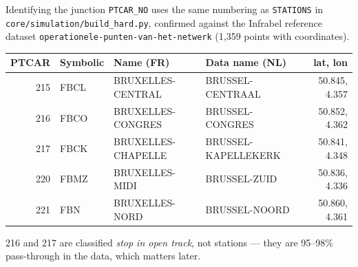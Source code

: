 \documentclass[aspectratio=169,10pt]{beamer}
\newcommand{\srcnote}[1]{{\scriptsize\color{ink3}#1}}
\begin{document}
\begin{frame}{Identifying the junction}
  \texttt{PTCAR\_NO} uses the same numbering as \texttt{STATIONS} in
  \texttt{core/simulation/build\_hard.py}, confirmed against the Infrabel reference
  dataset \texttt{operationele-punten-van-het-netwerk} (1{,}359 points with coordinates).

  \vspace{0.8em}
  \centering
  \begin{tabular}{@{}rlllr@{}}
    \toprule
    PTCAR & Symbolic & Name (FR) & Data name (NL) & lat, lon \\
    \midrule
    215 & FBCL & BRUXELLES-CENTRAL & BRUSSEL-CENTRAAL & 50.845, 4.357 \\
    216 & FBCO & BRUXELLES-CONGRES & BRUSSEL-CONGRES & 50.852, 4.362 \\
    217 & FBCK & BRUXELLES-CHAPELLE & BRUSSEL-KAPELLEKERK & 50.841, 4.348 \\
    220 & FBMZ & BRUXELLES-MIDI & BRUSSEL-ZUID & 50.836, 4.336 \\
    221 & FBN & BRUXELLES-NORD & BRUSSEL-NOORD & 50.860, 4.361 \\
    \bottomrule
  \end{tabular}

  \vspace{1em}
  \raggedright
  \srcnote{216 and 217 are classified \emph{stop in open track}, not stations --- they are
  95--98\% pass-through in the data, which matters later.}
\end{frame}
\end{document}
